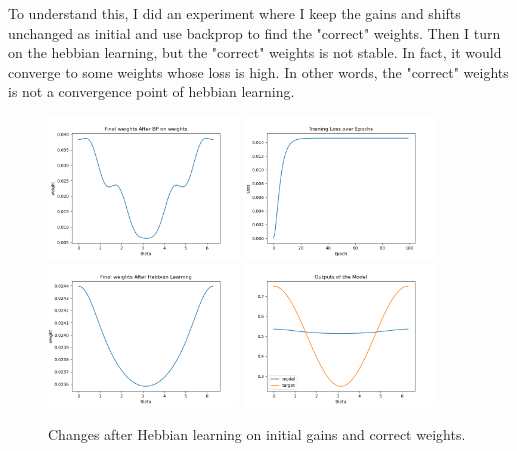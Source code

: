 \documentclass[12pt, a4paper]{article}
\begin{document}
To understand this, I did an experiment where I keep the gains and shifts unchanged as initial and use backprop to find the "correct" weights. Then I turn on the hebbian learning, but the "correct" weights is not stable. In fact, it would converge to some weights whose loss is high. In other words, the "correct" weights is not a convergence point of hebbian learning.

\begin{figure}[H]
    \centering
    \includegraphics[width=0.45\textwidth]{FNN/fig/0122_abb05_wt_weights.png}
    \includegraphics[width=0.45\textwidth]{FNN/fig/0122_abb05_wtconv_loss.png} \\
    \includegraphics[width=0.45\textwidth]{FNN/fig/0122_abb05_wtconv_weights.png}
    \includegraphics[width=0.45\textwidth]{FNN/fig/0122_abb05_wtconv_output.png}
    \caption{Changes after Hebbian learning on initial gains and correct weights.}
\end{figure}
\end{document}
